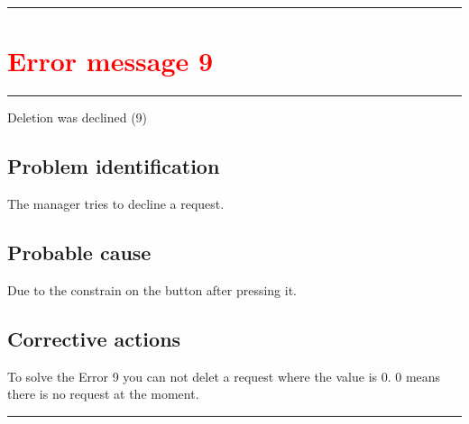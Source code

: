 \vspace{0.5cm}
\hrule


\section{{\textcolor{red}{Error message 9}}}
\hrule
\vspace{0.5cm}
Deletion was declined (9)

\subsection{Problem identification}
The manager tries to decline a request.

\subsection{Probable cause}
Due to the constrain on the button after pressing it.

\subsection{Corrective actions}
To solve the Error 9 you can not delet a request where the value is 0. 0 means
there is no request at the moment.

\vspace{0.5cm}
\hrule








